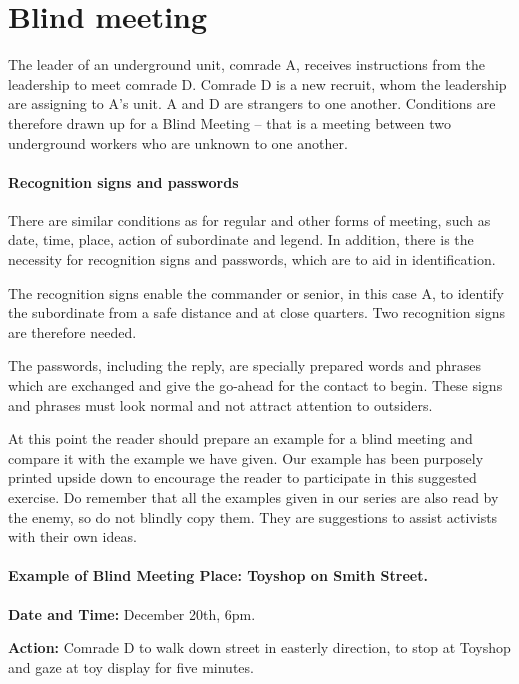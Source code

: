 \section{Blind meeting}

The leader of an underground unit, comrade A, receives instructions from
the leadership to meet comrade D. Comrade D is a new recruit, whom the
leadership are assigning to A's unit. A and D are strangers to one
another. Conditions are therefore drawn up for a Blind Meeting -- that
is a meeting between two underground workers who are unknown to one
another.

\paragraph{Recognition signs and passwords}

There are similar conditions as for regular and other forms of meeting,
such as date, time, place, action of subordinate and legend. In
addition, there is the necessity for recognition signs and passwords,
which are to aid in identification.

The recognition signs enable the commander or senior, in this case A, to
identify the subordinate from a safe distance and at close quarters. Two
recognition signs are therefore needed.

The passwords, including the reply, are specially prepared words and
phrases which are exchanged and give the go-ahead for the contact to
begin. These signs and phrases must look normal and not attract
attention to outsiders.

At this point the reader should prepare an example for a blind meeting
and compare it with the example we have given. Our example has been
purposely printed upside down to encourage the reader to participate in
this suggested exercise. Do remember that all the examples given in our
series are also read by the enemy, so do not blindly copy them. They are
suggestions to assist activists with their own ideas.

\paragraph{Example of Blind Meeting Place: Toyshop on Smith Street.}

\textbf{Date and Time:} December 20th, 6pm.

\textbf{Action:} Comrade D to walk down street in easterly direction, to
stop at Toyshop and gaze at toy display for five minutes.

